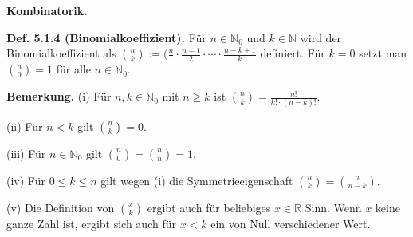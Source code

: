 \textbf{Kombinatorik.}

\textbf{Def. 5.1.4 (Binomialkoeffizient).} Für $n \in \mathbb N_0$ und $k \in \mathbb N$ wird der Binomialkoeffizient als $\binom{n}{k} := ( \frac{n}{1} \cdot \frac{n-1}{2} \cdot \cdots \cdot \frac{n-k+1}{k}$ definiert. Für $k=0$ setzt man $\binom{n}{0} = 1$ für alle $n \in \mathbb N_0$. 

\textbf{Bemerkung.} (i) Für $n,k \in \mathbb N_0$ mit $n \geq k$ ist $\binom{n}{k} = \frac{n!}{k!\cdot (n-k)!}$.

(ii) Für $n<k$ gilt $\binom{n}{k} = 0$.

(iii) Für $n \in \mathbb N_0$ gilt $\binom{n}{0} = \binom{n}{n} = 1$.

(iv) Für $0 \leq k \leq n$ gilt wegen (i) die Symmetrieeigenschaft $\binom{n}{k} = \binom{n}{n-k}$.

(v) Die Definition von $\binom{x}{k}$ ergibt auch für beliebiges $x\in \mathbb R$ Sinn. Wenn $x$ keine ganze Zahl ist, ergibt sich auch für $x<k$ ein von Null verschiedener Wert.